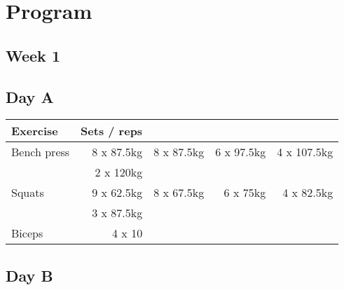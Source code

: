 \documentclass[12pt, a4paper]{article}%
\begin{document}
\clearpage
\section*{Program}
 \subsection*{\hspace{0.25em} Week 1 }
  \subsection*{\hspace{0.5em} Day A }


  \begin{tabular}{l|rrrr}
  \hspace{0.75em} \textbf{Exercise} & \textbf{Sets / reps} \\ \hline

            \hspace{0.75em} Bench press
            & 8 x 87.5kg
            & 8 x 87.5kg
            & 6 x 97.5kg
            & 4 x 107.5kg
            \\


            \hspace{0.75em}
            & 2 x 120kg
            & 
            & 
            & 
            \\


            \hspace{0.75em} Squats
            & 9 x 62.5kg
            & 8 x 67.5kg
            & 6 x 75kg
            & 4 x 82.5kg
            \\


            \hspace{0.75em}
            & 3 x 87.5kg
            & 
            & 
            & 
            \\


   \hspace{0.75em} Biceps & 4 x 10 \\
  \end{tabular}

  \subsection*{\hspace{0.5em} Day B }
\end{document}

